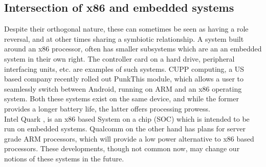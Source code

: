 \documentclass[seminar,twoside]{iitbreport}
\begin{document}
\subsection{Intersection of x86 and embedded systems}
Despite their orthogonal nature, these can sometimes be seen as having a role reversal, and at other times sharing a symbiotic relationship.
A system built around an x86 processor, often has smaller subsystems which are an an embedded system in their own right. The controller card on a hard drive, peripheral interfacing units,
etc. are examples of such systems. CUPP computing, a US based company recently rolled out PunkThis module, which allows a user to seamlessly switch between Android, running on ARM
and an x86 operating system. Both these systems exist on the same device, and while the former provides a longer battery life, the latter offers processing prowess.
\\
Intel Quark , is an x86 based System on a chip (SOC) which is intended to be run on embedded systems. Qualcomm on the other hand has plans for server grade ARM processors, which
will provide a low power alternative to x86 based processors. These developments, though not common now, may change our notions of these systems in the future.
\end{document}
